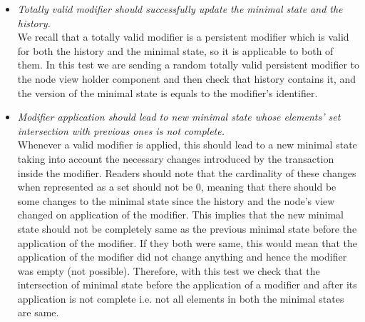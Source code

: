 \begin{enumerate}[\IEEEsetlabelwidth{Z}]
\begin{itemize}[]

\item \textit{Totally valid modifier should successfully update the minimal state and the history.}\\
We recall that a totally valid modifier is a persistent modifier which is valid for both the history and the minimal state, so it is applicable to both of them. In this test we are sending a random totally valid persistent modifier to the node view holder component and then check that history contains it, and the version of the minimal state is equals to the modifier's identifier.

\item \textit{Modifier application should lead to new minimal state whose elements' set intersection with previous ones is not complete.}\\
Whenever a valid modifier is applied, this should lead to a new minimal state taking into account the necessary changes introduced by the transaction inside the modifier. Readers should note that the cardinality of these changes when represented as a set should not be 0, meaning that there should be some changes to the minimal state since the history and the node's view changed on application of the modifier. This implies that the new minimal state should not be completely same as the previous minimal state before the application of the modifier. If they both were same, this would mean that the application of the modifier did not change anything and hence the modifier was empty (not possible). Therefore, with this test we check that the intersection of minimal state before the application of a modifier and after its application is not complete i.e. not all elements in both the minimal states are same.
\end{itemize}
\end{enumerate}



